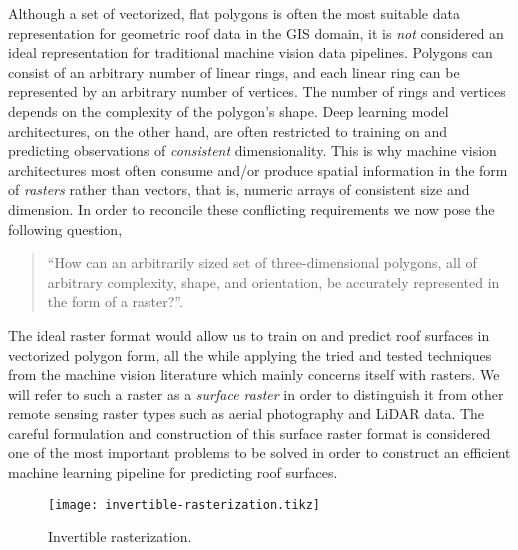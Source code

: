 Although a set of vectorized, flat polygons is often the most suitable data representation for geometric roof data in the GIS domain, it is \emph{not} considered an ideal representation for traditional machine vision data pipelines.
Polygons can consist of an arbitrary number of linear rings, and each linear ring can be represented by an arbitrary number of vertices.
The number of rings and vertices depends on the complexity of the polygon's shape.
Deep learning model architectures, on the other hand, are often restricted to training on and predicting observations of \emph{consistent} dimensionality.
This is why machine vision architectures most often consume and/or produce spatial information in the form of \emph{rasters} rather than vectors, that is, numeric arrays of consistent size and dimension.
In order to reconcile these conflicting requirements we now pose the following question,
%
\begin{quotation}
  \enquote{How can an arbitrarily sized set of three-dimensional polygons, all of arbitrary complexity, shape, and orientation, be accurately represented in the form of a raster?}.
\end{quotation}
%
The ideal raster format would allow us to train on and predict roof surfaces in vectorized polygon form, all the while applying the tried and tested techniques from the machine vision literature which mainly concerns itself with rasters.
We will refer to such a raster as a \textit{surface raster} in order to distinguish it from other remote sensing raster types such as aerial photography and LiDAR data.
The careful formulation and construction of this surface raster format is considered one of the most important problems to be solved in order to construct an efficient machine learning pipeline for predicting roof surfaces.
\begin{figure}
  \begin{center}
    \texttt{[image: invertible-rasterization.tikz]}
  \end{center}
  \vspace{-1.5em}
  \caption{Invertible rasterization.}
  \label{fig:invertible-rasterization}
  \vspace{-1.5em}
\end{figure}

